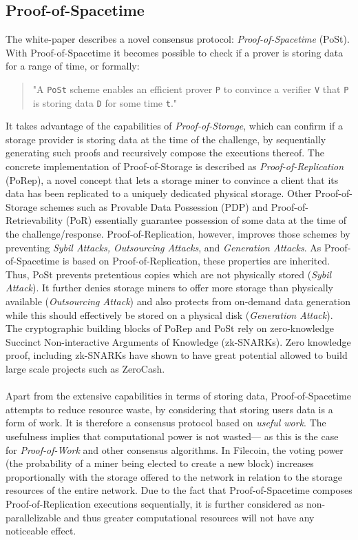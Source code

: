 \documentclass[conference]{IEEEtran}
\begin{document}
\subsection{Proof-of-Spacetime}
\label{subsec:pos}
The white-paper\cite{filecoin} describes a novel consensus protocol: \textit{Proof-of-Spacetime} (PoSt).
With Proof-of-Spacetime it becomes possible to check if a prover is storing data for a range of time, or formally:
\begin{quotation}
"A \texttt{PoSt} scheme enables an efficient prover \texttt{P} to convince a verifier \texttt{V} that \texttt{P} is storing data \texttt{D} for some time \texttt{t}."\cite{filecoin}
\end{quotation}
It takes advantage of the capabilities of \textit{Proof-of-Storage}\cite{proof-storage}, which can confirm if a storage provider is storing data at the time of the challenge, by sequentially generating such proofs and recursively compose the executions thereof.
The concrete implementation of Proof-of-Storage is described as \textit{Proof-of-Replication} (PoRep), a novel concept that lets a storage miner to convince a client that its data has been replicated to a uniquely dedicated physical storage.
Other Proof-of-Storage schemes such as Provable Data Possession (PDP)\cite{proof-possession} and Proof-of-Retrievability (PoR)\cite{proof-retrievability} essentially guarantee possession of some data at the time of the challenge/response.
Proof-of-Replication, however, improves those schemes by preventing \textit{Sybil Attacks, Outsourcing Attacks}, and \textit{Generation Attacks}.
As Proof-of-Spacetime is based on Proof-of-Replication, these properties are inherited.
Thus, PoSt prevents pretentious copies which are not physically stored (\textit{Sybil Attack}).
It further denies storage miners to offer more storage than physically available (\textit{Outsourcing Attack}) and also protects from on-demand data generation while this should effectively be stored on a physical disk (\textit{Generation Attack}).
The cryptographic building blocks of PoRep and PoSt rely on zero-knowledge Succinct Non-interactive Arguments of Knowledge (zk-SNARKs).
Zero knowledge proof, including zk-SNARKs have shown to have great potential allowed to build large scale projects such as ZeroCash\cite{zcash}. 
\\
\\
Apart from the extensive capabilities in terms of storing data, Proof-of-Spacetime attempts to reduce resource waste, by considering that storing users data is a form of work.
It is therefore a consensus protocol based on \textit{useful work}.
The usefulness implies that computational power is not wasted--- as this is the case for \textit{Proof-of-Work}\cite{bitcoin} and other consensus algorithms.
In Filecoin, the voting power (the probability of a miner being elected to create a new block) increases proportionally with the storage offered to the network in relation to the storage resources of the entire network.
Due to the fact that Proof-of-Spacetime composes  Proof-of-Replication executions sequentially, it is further considered as non-parallelizable and thus greater computational resources will not have any noticeable effect. \cite{filecoin}
\end{document}
